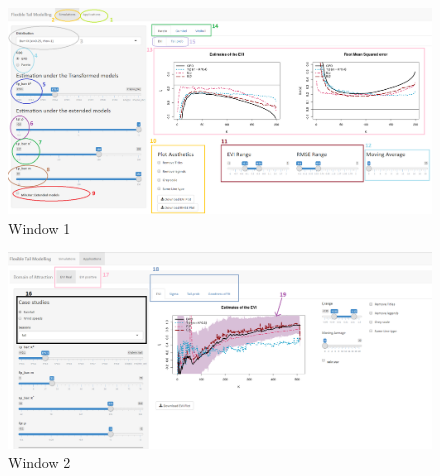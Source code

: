 \begin{subappendices}
\begin{enumerate}
\end{enumerate}

\begin{landscape}
\begin{figure}
  \centering
  \includegraphics[width=1.4\textwidth,height=0.9\textwidth]{./plots/shiny_window1.PNG}
    \caption{Window 1}
  \label{fig:shiny_window1}
  \end{figure}
  
  \begin{figure}
  \centering
  \includegraphics[width=1.4\textwidth,height=0.9\textwidth]{./plots/shiny_window2.PNG}
    \caption{Window 2}
  \label{fig:shiny_window2}
  \end{figure}
  

\end{landscape}
\end{subappendices}
